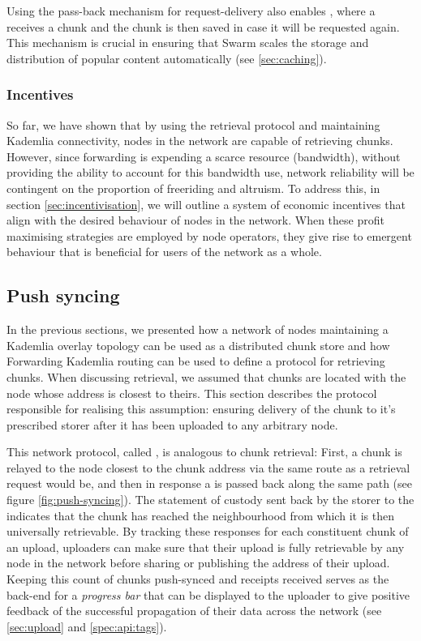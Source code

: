 Using the pass-back mechanism for request-delivery also enables , where a  receives a chunk and the chunk is then saved in case it will be requested again. This mechanism is crucial in ensuring that Swarm scales the storage and distribution of popular content automatically (see \ref{sec:caching}).

\subsubsection{Incentives}

So far, we have shown that by using the retrieval protocol and maintaining Kademlia connectivity, nodes in the network are capable of retrieving chunks. However, since forwarding is expending a scarce resource (bandwidth), without providing the ability to account for this bandwidth use, network reliability will be contingent on the proportion of freeriding and altruism. To address this, in section \ref{sec:incentivisation}, we will outline a system of economic incentives that align with the desired behaviour of nodes in the network. When these profit maximising strategies are employed by node operators, they give rise to emergent behaviour that is beneficial for users of the network as a whole.
 
\subsection{Push syncing\statusgreen}\label{sec:push-syncing}
 
In the previous sections, we presented how a network of nodes maintaining a Kademlia overlay topology can be used as a distributed chunk store and how Forwarding Kademlia routing can be used to define a protocol for retrieving chunks.
When discussing retrieval, we assumed that chunks are located with the node whose address is closest to theirs. This section describes the protocol responsible for realising this assumption: ensuring delivery of the chunk to it's prescribed storer after it has been uploaded to any arbitrary node.

This network protocol, called , is analogous to chunk retrieval: First, a chunk is relayed to the node closest to the chunk address via the same route as a retrieval request would be, and then in response a  is passed back along the same path (see figure \ref{fig:push-syncing}). The statement of custody sent back by the storer to the  indicates that the chunk has reached the neighbourhood from which it is then universally retrievable. By tracking these responses for each constituent chunk of an upload, uploaders can make sure that their upload is fully retrievable by any node in the network before sharing or publishing the address of their upload. Keeping this count of chunks push-synced and receipts received serves as the back-end for a \emph{progress bar} that can be displayed to the uploader to give positive feedback of the successful propagation of their data across the network (see \ref{sec:upload} and \ref{spec:api:tags}).


